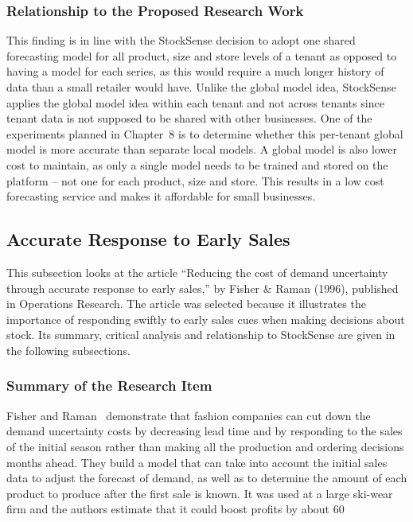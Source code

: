 \documentclass{StockSense}
\begin{document}
\subsubsection{Relationship to the Proposed Research Work}

This finding is in line with the StockSense decision to adopt one shared forecasting model for all product, size and store levels of a tenant as opposed to having a model for each series, as this would require a much longer history of data than a small retailer would have. Unlike the global model idea, StockSense applies the global model idea within each tenant and not across tenants since tenant data is not supposed to be shared with other businesses. One of the experiments planned in Chapter~8 is to determine whether this per-tenant global model is more accurate than separate local models. A global model is also lower cost to maintain, as only a single model needs to be trained and stored on the platform – not one for each product, size and store. This results in a low cost forecasting service and makes it affordable for small businesses.

\subsection{Accurate Response to Early Sales}

This subsection looks at the article ``Reducing the cost of demand uncertainty through accurate response to early sales,'' by Fisher \& Raman (1996), published in Operations Research. The article was selected because it illustrates the importance of responding swiftly to early sales cues when making decisions about stock. Its summary, critical analysis and relationship to StockSense are given in the following subsections.

\subsubsection{Summary of the Research Item}

Fisher and Raman~\cite{fisher1996reducing} demonstrate that fashion companies can cut down the demand uncertainty costs by decreasing lead time and by responding to the sales of the initial season rather than making all the production and ordering decisions months ahead. They build a model that can take into account the initial sales data to adjust the forecast of demand, as well as to determine the amount of each product to produce after the first sale is known. It was used at a large ski-wear firm and the authors estimate that it could boost profits by about 60%
\end{document}

